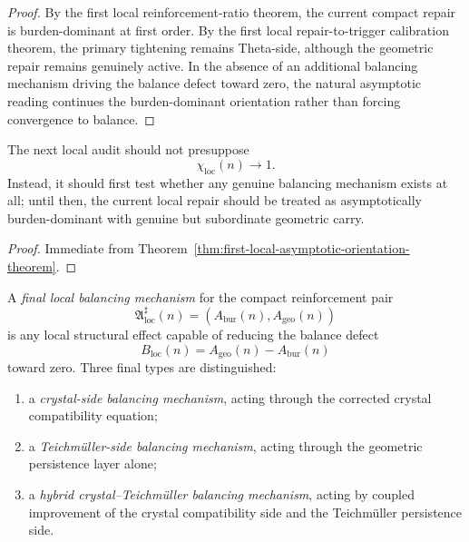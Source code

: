 \begin{proof}
By the first local reinforcement-ratio theorem, the current compact repair is burden-dominant at first order. By the first local repair-to-trigger calibration theorem, the primary tightening remains Theta-side, although the geometric repair remains genuinely active. In the absence of an additional balancing mechanism driving the balance defect toward zero, the natural asymptotic reading continues the burden-dominant orientation rather than forcing convergence to balance.
\end{proof}

\begin{corollary}
\label{cor:current-asymptotic-working-rule}
The next local audit should not presuppose
\[
 \chi_{\mathrm{loc}}(n)\to 1.
\]
Instead, it should first test whether any genuine balancing mechanism exists at all; until then, the current local repair should be treated as asymptotically burden-dominant with genuine but subordinate geometric carry.
\end{corollary}

\begin{proof}
Immediate from Theorem~\ref{thm:first-local-asymptotic-orientation-theorem}.
\end{proof}

\begin{definition}
\label{def:final-local-balancing-mechanisms}
A \emph{final local balancing mechanism} for the compact reinforcement pair
\[
 \mathfrak A_{\mathrm{loc}}^{\sharp}(n)=(A_{\mathrm{bur}}(n),A_{\mathrm{geo}}(n))
\]
is any local structural effect capable of reducing the balance defect
\[
 B_{\mathrm{loc}}(n)=A_{\mathrm{geo}}(n)-A_{\mathrm{bur}}(n)
\]
toward zero. Three final types are distinguished:
\begin{enumerate}[leftmargin=2em,label=(\alph*)]
 \item a \emph{crystal-side balancing mechanism}, acting through the corrected crystal compatibility equation;
 \item a \emph{Teichm\"uller-side balancing mechanism}, acting through the geometric persistence layer alone;
 \item a \emph{hybrid crystal--Teichm\"uller balancing mechanism}, acting by coupled improvement of the crystal compatibility side and the Teichm\"uller persistence side.
\end{enumerate}
\end{definition}

